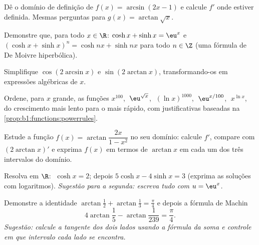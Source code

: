 \begin{exercise}[$\star$]\label{exo:b1:functions:2}
Dê o domínio de definição de $f(x) = \arcsin(2x - 1)$ e calcule
$f'$ onde estiver definida. Mesmas perguntas para $g(x) = \arctan\sqrt{x}$.
\end{exercise}

\begin{exercise}[$\star$]\label{exo:b1:functions:3}
Demonstre que, para todo $x \in \R$: $\cosh x + \sinh x = \eu^x$ e
$(\cosh x + \sinh x)^n = \cosh nx + \sinh nx$ para todo $n \in \Z$
(uma fórmula de De Moivre hiperbólica).
\end{exercise}

\begin{exercise}[$\star$]\label{exo:b1:functions:4}
Simplifique $\cos(2\arcsin x)$ e $\sin(2\arctan x)$, transformando-os em
expressões algébricas de $x$.
\end{exercise}

\begin{exercise}[$\star$]\label{exo:b1:functions:5}
Ordene, para $x$ grande, as funções
$x^{100}$, $\;\eu^{\sqrt x}$, $\;(\ln x)^{1000}$, $\;\eu^{x/100}$,
$\;x^{\ln x}$, do crescimento mais lento para o mais rápido, com
justificativas baseadas na \cref{prop:b1:functions:powerrules}.
\end{exercise}

\begin{exercise}[$\star\star$]\label{exo:b1:functions:6}
Estude a função $f(x) = \arctan\dfrac{2x}{1 - x^2}$ no seu domínio:
calcule $f'$, compare com $(2\arctan x)'$ e exprima $f(x)$ em
termos de $\arctan x$ em cada um dos três intervalos do domínio.
\end{exercise}

\begin{exercise}[$\star\star$]\label{exo:b1:functions:7}
Resolva em $\R$: $\;\cosh x = 2$; depois $5\cosh x - 4 \sinh x = 3$
(exprima as soluções com logaritmos). \emph{Sugestão para a segunda:
escreva tudo com $u = \eu^x$.}
\end{exercise}

\begin{exercise}[$\star\star$]\label{exo:b1:functions:8}
Demonstre a identidade $\arctan\frac{1}{2} + \arctan\frac{1}{3} =
\frac{\pi}{4}$ e depois a fórmula de Machin
\[
4\arctan\frac 15 - \arctan\frac{1}{239} = \frac{\pi}{4}.
\]
\emph{Sugestão: calcule a tangente dos dois lados usando a fórmula da
soma e controle em que intervalo cada lado se encontra.}
\end{exercise}

